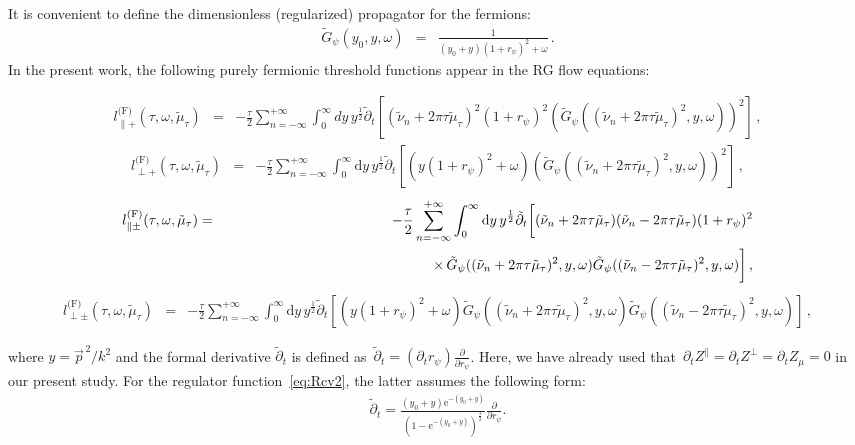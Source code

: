 \documentclass[prd,english,preprintnumbers,amsmath,amssymb,nofootinbib,twocolumn,superscriptaddress]{revtex4-1}
\newcommand{\E}{\mathrm{e}}
\newcommand{\be}{\begin{eqnarray}}
\newcommand{\ee}{\end{eqnarray}}
\newcommand{\del}{\partial}
\newcommand{\nn}{\nonumber }
\begin{document}
{{It is convenient to define the dimensionless (regularized) propagator for the fermions:
%
\be
\tilde G_\psi (y_0,y,\omega) &=& \frac{1}{(y_0+y)(1+r_\psi)^2 + \omega}\,.
\ee
%
In the present work, the following purely fermionic threshold functions appear in the RG flow equations:
%
\begin{widetext}
%
\be
l^{\text{(F)}}_{\parallel +} (\tau, \omega, \tilde \mu_{\tau}) &=& -\frac{\tau}{2} \sum _{n=-\infty}^{+\infty} \int _0 ^{\infty} d y \, y^{\frac{1}{2}} \tilde \partial _t \left[  \left(\tilde \nu _n + 2 \pi \tau \tilde \mu_{\tau} \right)^2 (1+r_\psi)^2 \left( \tilde G _\psi ( (\tilde \nu _n + 2 \pi \tau \tilde \mu_{\tau} )^2 ,y,\omega)\right)^2 \right]\,,
\ee
%
%
\be
l^{\text{(F)}}_{\perp +} (\tau, \omega, \tilde \mu_{\tau}) &=& -\frac{\tau}{2} \sum _{n=-\infty}^{+\infty} \int _0 ^{\infty} \text{d} y \, y^{\frac{1}{2}} \tilde \partial _t \left[\left(y(1+r_\psi)^2 + \omega\right) \left( \tilde G _\psi ( (\tilde \nu _n + 2 \pi \tau \tilde \mu_{\tau} )^2 ,y,\omega)\right)^2 \right]\,, 
\ee
%
%
\be
l^{\text{(F)}}_{\parallel \pm} (\tau, \omega, \tilde \mu_{\tau}) &=& -\frac{\tau}{2} \sum _{n=-\infty}^{+\infty} \int _0 ^{\infty} \text{d} y  \, y^{\frac{1}{2}} \tilde \partial _t \bigg[ (\tilde \nu _n + 2 \pi \tau \tilde \mu_{\tau} )(\tilde \nu _n - 2 \pi \tau \tilde \mu_{\tau} )(1+r_\psi)^2 \nn \\ && \hspace{5.2cm} 
\times\, \tilde G _\psi ( (\tilde \nu _n + 2 \pi \tau \tilde \mu_{\tau} )^2 ,y,\omega)\tilde G _\psi ( (\tilde \nu _n - 2 \pi \tau \tilde \mu_{\tau} )^2 ,y,\omega) \bigg]\,,
\ee
%
%
\be
l^{\text{(F)}}_{\perp \pm} (\tau, \omega, \tilde \mu_{\tau}) &=& -\frac{\tau}{2}\!\sum _{n=-\infty}^{+\infty} \int _0 ^{\infty}\! \text{d} y \, y^{\frac{1}{2}} \tilde \partial _t \left[\left( y(1\!+\! r_\psi)^2 \!+\! \omega \right)\! \tilde G _\psi ( (\tilde \nu _n \!+\! 2 \pi \tau \tilde \mu_{\tau} )^2 ,y,\omega)\tilde G _\psi ( (\tilde \nu _n \!-\! 2 \pi \tau \tilde \mu_{\tau} )^2 ,y,\omega) \right]\,,
\ee
%
\end{widetext}
%
where $y = \vec{p}^{\,2} / k^2$ and
the formal derivative $\tilde \del _t$ is defined as~$\tilde \del _t = \left( \del_t r_{\psi}\right) \frac{\del}{\del r_{\psi}}$.
Here, we have already used that~$\partial_t Z^{\parallel} = \partial_t Z^{\perp} =\partial_t Z_{\mu} =0$ in our present study.
For the regulator function~\eqref{eq:Rcv2}, the latter assumes the following form:
%
\be
\tilde \del _t = \frac{(y_0+y) \E^{-(y_0+y)}}{(1\!-\!\E^{-(y_0+y)})^{\frac{3}{2}}}  \frac{\del}{\del r_\psi}.
\ee
}}
\end{document}
